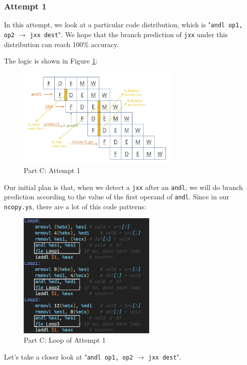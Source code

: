 \documentclass[12pt,a4paper]{article}
\begin{document}
\subsubsection{Attempt 1}
In this attempt, we look at a particular code distribution, 
which is "\texttt{andl op1, op2} $\rightarrow$ \texttt{jxx dest}". 
We hope that the branch prediction of \texttt{jxx} under this distribution can reach 100\% accuracy.

The logic is shown in Figure \ref{Fig.partC-attempt1}:
\begin{figure}[H] %
        \centering %
        \includegraphics[width=0.7\textwidth]{partC-attempt1.jpg} %
        \caption{Part C: Attempt 1} %
        \label{Fig.partC-attempt1} %
\end{figure}
Our initial plan is that, when we detect a \texttt{jxx} after an \texttt{andl}, 
we will do branch prediction according to the value of the first operand of \texttt{andl}. 
Since in our \texttt{ncopy.ys}, there are a lot of this code patterns:
\begin{figure}[H] %
        \centering %
        \includegraphics[width=0.6\textwidth]{partC-loop-demo.jpg} %
        \caption{Part C: Loop of Attempt 1} %
        \label{Fig.partC-at1-loop} %
\end{figure}
Let's take a closer look at "\texttt{andl op1, op2} $\rightarrow$ \texttt{jxx dest}".
\end{document}
